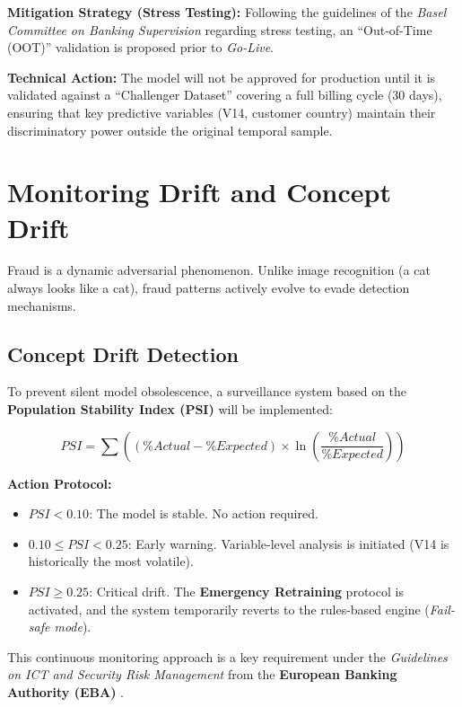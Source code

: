 \documentclass[12pt,a4paper]{report}
\begin{document}
\textbf{Mitigation Strategy (Stress Testing):}  
Following the guidelines of the \textit{Basel Committee on Banking Supervision} regarding stress testing, an \textquotedblleft Out-of-Time (OOT)\textquotedblright{} validation is proposed prior to \textit{Go-Live}.

\textbf{Technical Action:} The model will not be approved for production until it is validated against a \textquotedblleft Challenger Dataset\textquotedblright{} covering a full billing cycle (30 days), ensuring that key predictive variables (V14, customer country) maintain their discriminatory power outside the original temporal sample.

\section{Monitoring Drift and Concept Drift}

Fraud is a dynamic adversarial phenomenon. Unlike image recognition (a cat always looks like a cat), fraud patterns actively evolve to evade detection mechanisms.

\subsection{Concept Drift Detection}

To prevent silent model obsolescence, a surveillance system based on the \textbf{Population Stability Index (PSI)} will be implemented:

$$PSI = \sum \left( ( \%Actual - \%Expected ) \times \ln\left( \frac{\%Actual}{\%Expected} \right) \right)$$

\textbf{Action Protocol:}

\begin{itemize}
    \item $PSI < 0.10$: The model is stable. No action required.
    \item $0.10 \le PSI < 0.25$: Early warning. Variable-level analysis is initiated (V14 is historically the most volatile).
    \item $PSI \ge 0.25$: Critical drift. The \textbf{Emergency Retraining} protocol is activated, and the system temporarily reverts to the rules-based engine (\textit{Fail-safe mode}).
\end{itemize}

This continuous monitoring approach is a key requirement under the \textit{Guidelines on ICT and Security Risk Management} from the \textbf{European Banking Authority (EBA)} \cite{eba2019}.
\end{document}
